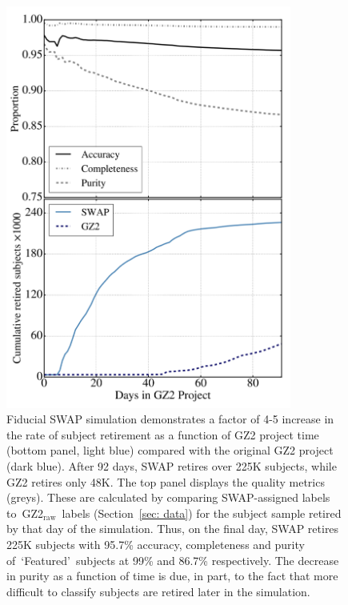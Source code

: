 \documentclass[twocolumn]{aastex6}
\newcommand{\feat}{`Featured'}
\newcommand{\raw}{GZ2$_{\text{raw}}$}
\begin{document}
\begin{figure}[ht!]
\includegraphics[width=3.7in]{figures/GZX_eval_and_retirement_baseline_4paper.pdf}
\caption{Fiducial SWAP simulation demonstrates a factor of 4-5 increase in the rate of subject retirement as a function of GZ2 project time (bottom panel, light blue) compared with the original GZ2 project (dark blue). After 92 days, SWAP retires over 225K subjects, while GZ2 retires only 48K.  The top panel displays the quality metrics (greys). These are calculated by comparing SWAP-assigned labels to~\raw~labels (Section~\ref{sec: data}) for the subject sample retired by that day of the simulation. Thus, on the final day, SWAP retires 225K subjects with 95.7\% accuracy,  completeness and purity of~\feat~subjects at 99\% and 86.7\% respectively. The decrease in purity as a function of time is due, in part, to the fact that more difficult to classify subjects are retired later in the simulation. 
\label{fig: fiducial run}}
\end{figure}
\end{document}
